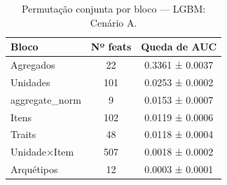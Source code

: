 \begin{table}[htbp]
\caption{Permutação conjunta por bloco — LGBM: Cenário A.}
\label{tab:permlgbm_A}
\centering
\small
\begin{tabular}{lcc}
\toprule
Bloco & Nº feats & Queda de AUC \\
\midrule
Agregados & 22 & 0.3361 ± 0.0037 \\
Unidades & 101 & 0.0253 ± 0.0002 \\
aggregate\_norm & 9 & 0.0153 ± 0.0007 \\
Itens & 102 & 0.0119 ± 0.0006 \\
Traits & 48 & 0.0118 ± 0.0004 \\
Unidade×Item & 507 & 0.0018 ± 0.0002 \\
Arquétipos & 12 & 0.0003 ± 0.0001 \\
\bottomrule
\end{tabular}
\end{table}
